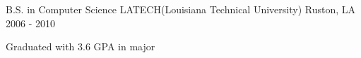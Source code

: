 

\begin{cventries}

  \cventry
    {B.S. in Computer Science} %
    {LATECH(Louisiana Technical University)} %
    {Ruston, LA} %
    {2006 - 2010} %
    {
      \begin{cvitems} %
        \item {Graduated with 3.6 GPA in major}
      \end{cvitems}
    }

\end{cventries}
